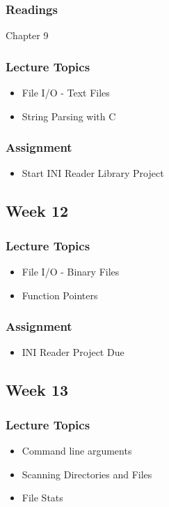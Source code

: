 \documentclass[a4paper,12pt]{report}
\begin{document}
\subsubsection*{ Readings }
Chapter 9
\subsubsection*{Lecture Topics}
\begin{itemize}
\item File I/O - Text Files
\item String Parsing with C
\end{itemize}
\subsubsection*{Assignment}
\begin{itemize}
\item Start INI Reader Library Project
\end{itemize}

\subsection*{Week 12}
\subsubsection*{Lecture Topics}
\begin{itemize}
\item File I/O - Binary Files
\item Function Pointers
\end{itemize}
\subsubsection*{Assignment}
\begin{itemize}
\item INI Reader Project Due
\end{itemize}

\subsection*{Week 13}
\subsubsection*{Lecture Topics}
\begin{itemize}
\item Command line arguments
\item Scanning Directories and Files
\item File Stats
\end{itemize}
\end{document}
